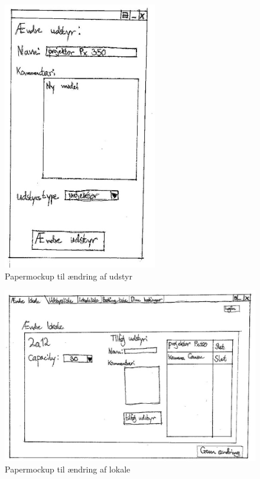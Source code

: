 \begin{figure}[h!]
  \centering
    \includegraphics[width=0.6\textwidth]{Appendix/GUI-Prototype/PaperMockup/AendreUdstyr_001}
  \caption{Papermockup til ændring af udstyr}
\label{App_GUI_paper_AendreUdstyr}
\end{figure}

\begin{figure}[h!]
  \centering
    \includegraphics[width=\textwidth]{Appendix/GUI-Prototype/PaperMockup/AendreLokale_001}
  \caption{Papermockup  til ændring af lokale}
\label{App_GUI_paper_AendreLokale}
\end{figure}

